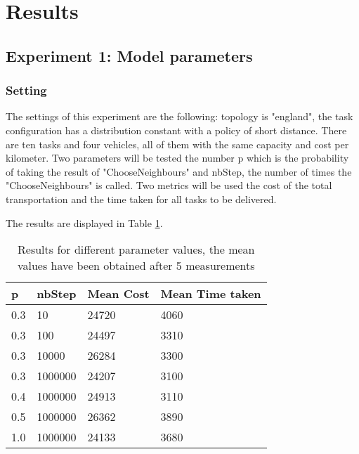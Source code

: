 \documentclass[11pt]{article}
\begin{document}
\section{Results}

\subsection{Experiment 1: Model parameters}

\subsubsection{Setting}
The settings of this experiment are the following: topology is "england", the task configuration has a distribution constant with a policy of short distance. There are ten tasks and four vehicles, all of them with the same capacity and cost per kilometer. Two parameters will be tested the number p which is the probability of taking the result of "ChooseNeighbours" and nbStep, the number of times the "ChooseNeighbours" is called. Two metrics will be used the cost of the total transportation and the time taken for all tasks to be delivered. 

The results are displayed in Table \ref{tab:1}.
\begin{table}
  \begin{center}
    \begin{tabular}{ | l | l | l | l |}
    \hline
    p & nbStep & Mean Cost & Mean Time taken \\ \hline
    0.3 & 10 & 24720 & 4060\\ \hline
    0.3 & 100 & 24497 & 3310 \\ \hline
    0.3 & 10000 & 26284 & 3300 \\ \hline
    0.3 & 1000000 & 24207 & 3100 \\ \hline
    0.4 & 1000000 & 24913 & 3110 \\\hline
    0.5 & 1000000 & 26362 & 3890 \\\hline
    1.0 & 1000000 & 24133 & 3680 \\\hline

    
    \end{tabular}
    \caption{Results for different parameter values, the mean values have been obtained after 5 measurements}
    \label{tab:1}
\end{center}
\end{table}
\end{document}
